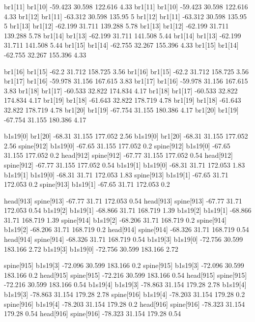 br1[11]    br1[10]    -59.423    30.598    122.616    4.33
br1[11]    br1[10]    -59.423    30.598    122.616    4.33
br1[12]    br1[11]    -63.312    30.598    135.95    5
br1[12]    br1[11]    -63.312    30.598    135.95    5
br1[13]    br1[12]    -62.199    31.711    139.288    5.78
br1[13]    br1[12]    -62.199    31.711    139.288    5.78
br1[14]    br1[13]    -62.199    31.711    141.508    5.44
br1[14]    br1[13]    -62.199    31.711    141.508    5.44
br1[15]    br1[14]    -62.755    32.267    155.396    4.33
br1[15]    br1[14]    -62.755    32.267    155.396    4.33


br1[16]    br1[15]    -62.2    31.712    158.725    3.56
br1[16]    br1[15]    -62.2    31.712    158.725    3.56
br1[17]    br1[16]    -59.978    31.156    167.615    3.83
br1[17]    br1[16]    -59.978    31.156    167.615    3.83
br1[18]    br1[17]    -60.533    32.822    174.834    4.17
br1[18]    br1[17]    -60.533    32.822    174.834    4.17
br1[19]    br1[18]    -61.643    32.822    178.719    4.78
br1[19]    br1[18]    -61.643    32.822    178.719    4.78
br1[20]    br1[19]    -67.754    31.155    180.386    4.17
br1[20]    br1[19]    -67.754    31.155    180.386    4.17


b1s19[0]    br1[20]    -68.31    31.155    177.052    2.56
b1s19[0]    br1[20]    -68.31    31.155    177.052    2.56
spine[912]    b1s19[0]    -67.65    31.155    177.052    0.2
spine[912]    b1s19[0]    -67.65    31.155    177.052    0.2
head[912]    spine[912]    -67.77    31.155    177.052    0.54
head[912]    spine[912]    -67.77    31.155    177.052    0.54
b1s19[1]    b1s19[0]    -68.31    31.71    172.053    1.83
b1s19[1]    b1s19[0]    -68.31    31.71    172.053    1.83
spine[913]    b1s19[1]    -67.65    31.71    172.053    0.2
spine[913]    b1s19[1]    -67.65    31.71    172.053    0.2


head[913]    spine[913]    -67.77    31.71    172.053    0.54
head[913]    spine[913]    -67.77    31.71    172.053    0.54
b1s19[2]    b1s19[1]    -68.866    31.71    168.719    1.39
b1s19[2]    b1s19[1]    -68.866    31.71    168.719    1.39
spine[914]    b1s19[2]    -68.206    31.71    168.719    0.2
spine[914]    b1s19[2]    -68.206    31.71    168.719    0.2
head[914]    spine[914]    -68.326    31.71    168.719    0.54
head[914]    spine[914]    -68.326    31.71    168.719    0.54
b1s19[3]    b1s19[0]    -72.756    30.599    183.166    2.72
b1s19[3]    b1s19[0]    -72.756    30.599    183.166    2.72


spine[915]    b1s19[3]    -72.096    30.599    183.166    0.2
spine[915]    b1s19[3]    -72.096    30.599    183.166    0.2
head[915]    spine[915]    -72.216    30.599    183.166    0.54
head[915]    spine[915]    -72.216    30.599    183.166    0.54
b1s19[4]    b1s19[3]    -78.863    31.154    179.28    2.78
b1s19[4]    b1s19[3]    -78.863    31.154    179.28    2.78
spine[916]    b1s19[4]    -78.203    31.154    179.28    0.2
spine[916]    b1s19[4]    -78.203    31.154    179.28    0.2
head[916]    spine[916]    -78.323    31.154    179.28    0.54
head[916]    spine[916]    -78.323    31.154    179.28    0.54


